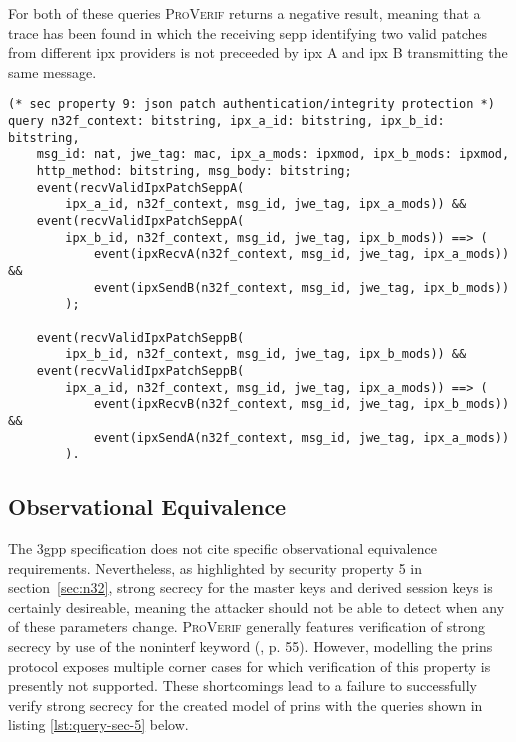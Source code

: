 For both of these queries \textsc{ProVerif} returns a negative result, meaning that a trace has been found in which the receiving \gls{sepp} identifying two valid patches from different \gls{ipx} providers is not preceeded by \gls{ipx} A and \gls{ipx} B transmitting the same message.

\begin{lstlisting}[caption={Query for security property 9},label={lst:query-sec-9},firstnumber=221]
(* sec property 9: json patch authentication/integrity protection *)
query n32f_context: bitstring, ipx_a_id: bitstring, ipx_b_id: bitstring,
    msg_id: nat, jwe_tag: mac, ipx_a_mods: ipxmod, ipx_b_mods: ipxmod,
    http_method: bitstring, msg_body: bitstring;
    event(recvValidIpxPatchSeppA(
        ipx_a_id, n32f_context, msg_id, jwe_tag, ipx_a_mods)) &&
    event(recvValidIpxPatchSeppA(
        ipx_b_id, n32f_context, msg_id, jwe_tag, ipx_b_mods)) ==> (
            event(ipxRecvA(n32f_context, msg_id, jwe_tag, ipx_a_mods)) &&
            event(ipxSendB(n32f_context, msg_id, jwe_tag, ipx_b_mods))
        );

    event(recvValidIpxPatchSeppB(
        ipx_b_id, n32f_context, msg_id, jwe_tag, ipx_b_mods)) &&
    event(recvValidIpxPatchSeppB(
        ipx_a_id, n32f_context, msg_id, jwe_tag, ipx_a_mods)) ==> (
            event(ipxRecvB(n32f_context, msg_id, jwe_tag, ipx_b_mods)) &&
            event(ipxSendA(n32f_context, msg_id, jwe_tag, ipx_a_mods))
        ).
\end{lstlisting}


\subsection{Observational Equivalence}
\label{ssec:equivalence}

The \gls{3gpp} specification does not cite specific observational equivalence requirements.
Nevertheless, as highlighted by security property 5 in section~\ref{sec:n32}, strong secrecy for the master keys and derived session keys is certainly desireable, meaning the attacker should not be able to detect when any of these parameters change.
\textsc{ProVerif} generally features verification of strong secrecy by use of the {\sffamily noninterf} keyword (\cite{blanchet2020proverif}, p. 55).
However, modelling the \gls{prins} protocol exposes multiple corner cases for which verification of this property is presently not supported.
These shortcomings lead to a failure to successfully verify strong secrecy for the created model of \gls{prins} with the queries shown in listing \ref{lst:query-sec-5} below.

